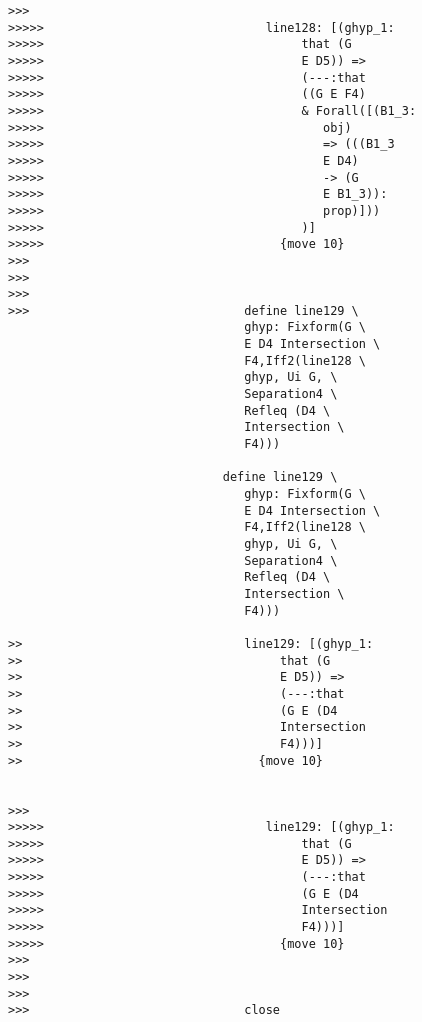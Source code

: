 \documentclass[12pt]{article}
\begin{document}
\begin{verbatim}
>>>
>>>>>                               line128: [(ghyp_1:
>>>>>                                    that (G
>>>>>                                    E D5)) =>
>>>>>                                    (---:that
>>>>>                                    ((G E F4)
>>>>>                                    & Forall([(B1_3:
>>>>>                                       obj)
>>>>>                                       => (((B1_3
>>>>>                                       E D4)
>>>>>                                       -> (G
>>>>>                                       E B1_3)):
>>>>>                                       prop)]))
>>>>>                                    )]
>>>>>                                 {move 10}
>>>
>>>
>>>
>>>                              define line129 \
                                 ghyp: Fixform(G \
                                 E D4 Intersection \
                                 F4,Iff2(line128 \
                                 ghyp, Ui G, \
                                 Separation4 \
                                 Refleq (D4 \
                                 Intersection \
                                 F4)))

                              define line129 \
                                 ghyp: Fixform(G \
                                 E D4 Intersection \
                                 F4,Iff2(line128 \
                                 ghyp, Ui G, \
                                 Separation4 \
                                 Refleq (D4 \
                                 Intersection \
                                 F4)))

>>                               line129: [(ghyp_1:
>>                                    that (G
>>                                    E D5)) =>
>>                                    (---:that
>>                                    (G E (D4
>>                                    Intersection
>>                                    F4)))]
>>                                 {move 10}


>>>
>>>>>                               line129: [(ghyp_1:
>>>>>                                    that (G
>>>>>                                    E D5)) =>
>>>>>                                    (---:that
>>>>>                                    (G E (D4
>>>>>                                    Intersection
>>>>>                                    F4)))]
>>>>>                                 {move 10}
>>>
>>>
>>>
>>>                              close


\end{verbatim}
\end{document}
